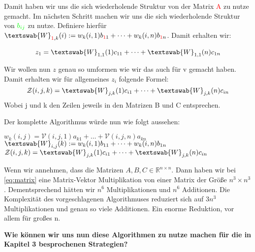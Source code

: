 Damit haben wir uns die sich wiederholende Struktur von der Matrix \textcolor{red}{A} zu nutze gemacht. Im nächsten Schritt machen wir uns die sich wiederholende Struktur von $\textcolor{green}{b_{ij}}$ zu nutze.
Definiere hierfür $\textswab{W}_{\textcolor{red}{1},k} (i):= w_k(i,1) b_{\textcolor{red}{1}1} + \dots + w_k(i,n) b_{\textcolor{red}{1}n}$. Damit erhalten wir:

\begin{equation} \label{eq:znew}
\begin{aligned}
z_{1}= \textswab{W}_{1,1}(1) c_{11}  + \dots +  \textswab{W}_{1,1}(n) c_{1n} 
\end{aligned}
\end{equation}

Wir wollen nun $z$ genau so umformen wie wir das auch für v gemacht haben. Damit erhalten wir für allgemeines $z_{i}$ folgende Formel:
\begin{equation}
\mathcal{Z}(i,j,k) = \textswab{W}_{j,k}(1) c_{i1}  + \dots +  \textswab{W}_{j,k}(n) c_{in} 
\end{equation}
Wobei j und k den Zeilen jeweils in den Matrizen B und C entsprechen. 

Der komplette Algorithmus würde nun wie folgt aussehen:
\begin{algorithmic}
			\State $w_{k}(i,j) = \mathcal{V}(i,j,1)a_{k1} + \dots + \mathcal{V}(i,j,n)a_{kn}$
		\EndFor
	\EndFor
\EndFor
{}
			\State $\textswab{W}_{i,j} (k):= w_k(i,1) b_{11} + \dots + w_k(i,n) b_{1n}$
		\EndFor
	\EndFor
\EndFor
{}
			\State $\mathcal{Z}(i,j,k) = \textswab{W}_{j,k}(1) c_{i1}  + \dots +  \textswab{W}_{j,k}(n) c_{in}$ 
		\EndFor
	\EndFor
\EndFor
\end{algorithmic}

 
Wenn wir annehmen, dass die Matrizen $A,B,C \in \mathbb{R}^{n \times n}$. Dann haben wir bei \ref{eq:matrix} eine Matrix-Vektor Multiplikation von einer Matrix der Größe $n^{3} \times n^{3}$. Dementsprechend hätten wir $n^{6}$ Multiplikationen und $n^{6}$ Additionen. Die Komplexität des vorgeschlagenen Algorithmuses reduziert sich auf $3n^{3}$ Multiplikationen und genau so viele Additionen.
Ein enorme Reduktion, vor allem für großes n.

\textbf{Wie können wir uns nun diese Algorithmen zu nutze machen für die in Kapitel 3 besprochenen Strategien?} \\

